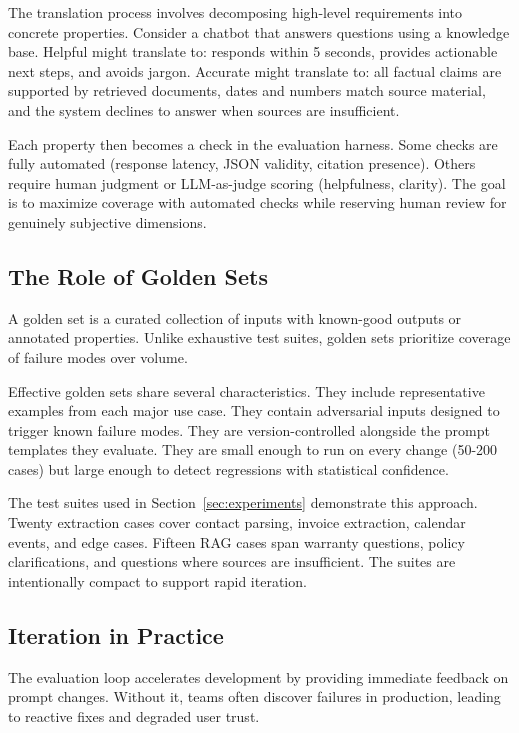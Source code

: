 The translation process involves decomposing high-level requirements into concrete properties. Consider a chatbot that answers questions using a knowledge base. Helpful might translate to: responds within 5 seconds, provides actionable next steps, and avoids jargon. Accurate might translate to: all factual claims are supported by retrieved documents, dates and numbers match source material, and the system declines to answer when sources are insufficient.

Each property then becomes a check in the evaluation harness. Some checks are fully automated (response latency, JSON validity, citation presence). Others require human judgment or LLM-as-judge scoring (helpfulness, clarity). The goal is to maximize coverage with automated checks while reserving human review for genuinely subjective dimensions.

\subsection{The Role of Golden Sets}

A golden set is a curated collection of inputs with known-good outputs or annotated properties. Unlike exhaustive test suites, golden sets prioritize coverage of failure modes over volume.

Effective golden sets share several characteristics. They include representative examples from each major use case. They contain adversarial inputs designed to trigger known failure modes. They are version-controlled alongside the prompt templates they evaluate. They are small enough to run on every change (50-200 cases) but large enough to detect regressions with statistical confidence.

The test suites used in Section~\ref{sec:experiments} demonstrate this approach. Twenty extraction cases cover contact parsing, invoice extraction, calendar events, and edge cases. Fifteen RAG cases span warranty questions, policy clarifications, and questions where sources are insufficient. The suites are intentionally compact to support rapid iteration.

\subsection{Iteration in Practice}

The evaluation loop accelerates development by providing immediate feedback on prompt changes. Without it, teams often discover failures in production, leading to reactive fixes and degraded user trust.

